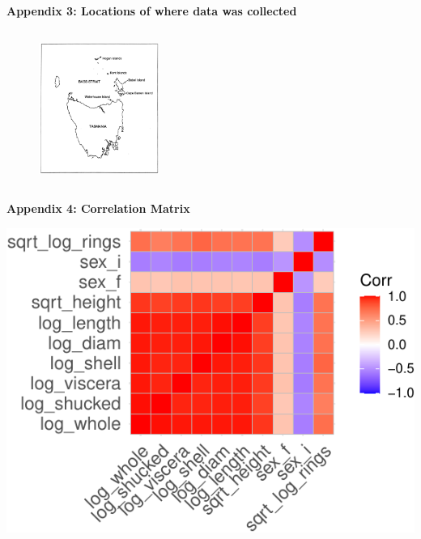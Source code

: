 \documentclass[letterpaper,9pt,twocolumn,twoside,]{pinp}
\begin{document}
\textbf{Appendix 3: Locations of where data was collected}

\begin{figure}[H]
    \begin{center}
    \includegraphics[width=0.35\textwidth, height=2in]{Independence} 
    \end{center}
\end{figure}

\textbf{Appendix 4: Correlation Matrix}

\begin{center}\includegraphics{ExecSum_files/figure-latex/unnamed-chunk-11-1} \end{center}


\pnasbreak 
\end{document}
